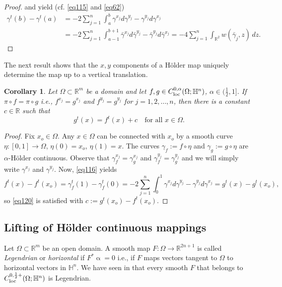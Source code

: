 \documentclass[intlimits,12pt,reqno]{amsart}
\newcommand{\bbbh}{\mathbb H}
\newcommand{\R}{\mathbb R}
\numberwithin{equation}{section}
\newtheorem{corollary}[theorem]{Corollary}
\theoremstyle{definition}
\begin{document}
\begin{proof}
 and  yield (cf. \eqref{eq115} and \eqref{eq62})
\[
\begin{split}
\gamma^t(b)-\gamma^t(a)
&=
-2\sum_{j=1}^n \int_a^b \gamma^{x_j}d\gamma^{y_j}-\gamma^{y_j}d\gamma^{x_j}\\
&=
-2\sum_{j=1}^n \int_{a-1}^{b+1} \bar{\gamma}^{x_j}d\bar{\gamma}^{y_j}-\bar{\gamma}^{y_j}d\bar{\gamma}^{x_j}
=
-4\sum_{j=1}^n\int_{\R^2} w(\bar{\gamma}_j,z)\, dz.
\end{split}
\]
\end{proof}

The next result shows that the $x,y$ components of a H\"older map uniquely determine the map up to a vertical translation. 
\begin{corollary}
\label{T92}
Let $\Omega\subset\R^m$ be a domain and let $f,g\in C^{0,\alpha}_{\rm loc}(\Omega;\bbbh^n)$, $\alpha\in (\frac{1}{2},1]$. If $\pi\circ f=\pi\circ g$ i.e., 
$f^{x_j}=g^{x_j}$ and $f^{y_j}=g^{y_j}$ for $j=1,2,\ldots,n$, then there is a constant $c\in\R$ such that
\begin{equation}
\label{eq120}
g^t(x)=f^t(x)+c
\quad
\text{for all } x\in\Omega.
\end{equation}
\end{corollary}
\begin{proof}
Fix $x_o\in\Omega$. Any $x\in\Omega$ can be connected with $x_o$ by a smooth curve $\eta:[0,1]\to\Omega$, $\eta(0)=x_o$, $\eta(1)=x$. The curves $\gamma_f:=f\circ\eta$ and $\gamma_g:=g\circ\eta$ are $\alpha$-H\"older continuous. Observe that $\gamma_f^{x_j}=\gamma_g^{x_j}$ and $\gamma_f^{y_j}=\gamma_g^{y_j}$ and we will simply write $\gamma^{x_j}$ and $\gamma^{y_j}$. Now, \eqref{eq116} yields
$$
f^t(x)-f^t(x_o)=\gamma_f^t(1)-\gamma_f^t(0)=
-2\sum_{j=1}^n \int_0^1 \gamma^{x_j}d\gamma^{y_j}-\gamma^{y_j}d\gamma^{x_j}
=g^t(x)-g^t(x_o),
$$
so \eqref{eq120} is satisfied with $c:=g^t(x_o)-f^t(x_o)$.
\end{proof}




\subsection{Lifting of H\"older continuous mappings}
\label{HM3}
Let $\Omega\subset\R^m$ be an open domain. A smooth map $F:\Omega\to\R^{2n+1}$ is called {\em Legendrian} or {\em horizontal} if $F^*\upalpha=0$ i.e., if $F$ maps vectors tangent to $\Omega$ to horizontal vectors in $\bbbh^n$. We have seen in  that every smooth $F$ that belongs to $C^{0,\frac{1}{2}+}_{\rm loc}(\Omega;\bbbh^n)$ is Legendrian.
\end{document}
